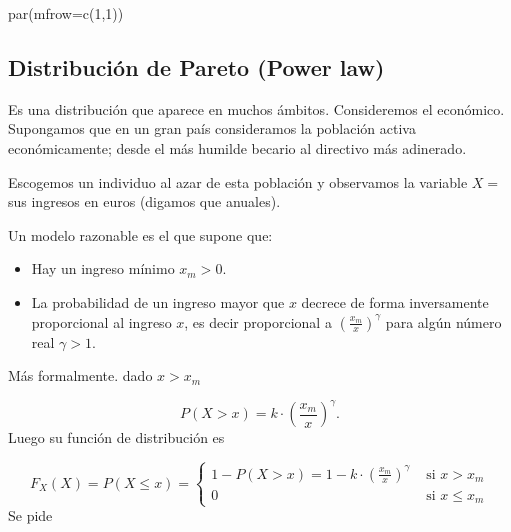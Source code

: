 \documentclass[
]{article}
\newenvironment{Shaded}{\begin{snugshade}}{\end{snugshade}}
\newcommand{\AttributeTok}[1]{\textcolor[rgb]{0.77,0.63,0.00}{#1}}
\newcommand{\DecValTok}[1]{\textcolor[rgb]{0.00,0.00,0.81}{#1}}
\newcommand{\FunctionTok}[1]{\textcolor[rgb]{0.00,0.00,0.00}{#1}}
\newcommand{\NormalTok}[1]{#1}
\providecommand{\tightlist}{%
  \setlength{\itemsep}{0pt}\setlength{\parskip}{0pt}}
\begin{document}
\begin{Shaded}
\begin{Highlighting}[]
\FunctionTok{par}\NormalTok{(}\AttributeTok{mfrow=}\FunctionTok{c}\NormalTok{(}\DecValTok{1}\NormalTok{,}\DecValTok{1}\NormalTok{))}
\end{Highlighting}
\end{Shaded}

\hypertarget{distribuciuxf3n-de-pareto-power-law}{%
\subsection{\texorpdfstring{\textbf{Distribución de Pareto}
(\textbf{Power
law})}{Distribución de Pareto (Power law)}}\label{distribuciuxf3n-de-pareto-power-law}}

Es una distribución que aparece en muchos ámbitos. Consideremos el
económico. Supongamos que en un gran país consideramos la población
activa económicamente; desde el más humilde becario al directivo más
adinerado.

Escogemos un individuo al azar de esta población y observamos la
variable \(X=\) sus ingresos en euros (digamos que anuales).

Un modelo razonable es el que supone que:

\begin{itemize}
\tightlist
\item
  Hay un ingreso mínimo \(x_m>0\).
\item
  La probabilidad de un ingreso mayor que \(x\) decrece de forma
  inversamente proporcional al ingreso \(x\), es decir proporcional a
  \(\left(\frac{x_m}{x}\right)^{\gamma}\) para algún número real
  \(\gamma >1.\)
\end{itemize}

Más formalmente. dado \(x>x_m\)

\[P(X>x)=k\cdot \left(\frac{x_m}{x}\right)^{\gamma}.\] Luego su función
de distribución es

\[
F_X(X)=P(X\leq x)=\left\{
\begin{array}{ll}
1-P(X > x)= 1- k\cdot \left(\frac{x_m}{x}\right)^{\gamma} & \mbox{ si } x>x_m\\
0 & \mbox{ si } x\leq x_m
\end{array}
\right.
\] Se pide
\end{document}
